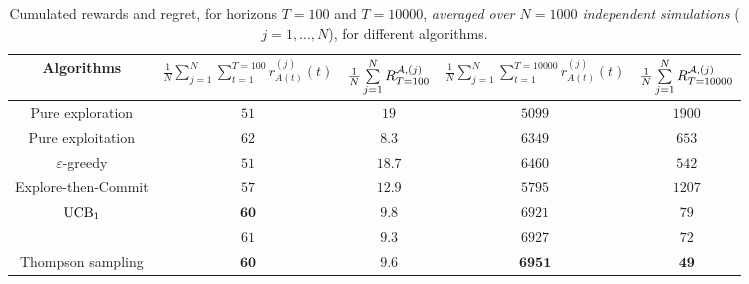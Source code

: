 \begin{table}[ht]
    \begin{small}  %
        \centering
        \begin{tabular}{c|cc|cc}
        \textbf{Algorithms} & $\frac{1}{N} \sum\limits_{j=1}^N \sum\limits_{t=1}^{T=100} r^{(j)}_{A(t)}(t)$ & $\frac{1}{N} \sum\limits_{j=1}^N R^{\mathcal{A},(j)}_{T=100}$ & $\frac{1}{N} \sum\limits_{j=1}^N \sum\limits_{t=1}^{T=10000} r^{(j)}_{A(t)}(t)$ & $\frac{1}{N} \sum\limits_{j=1}^N R^{\mathcal{A},(j)}_{T=10000}$ \\
            \hline
            Pure exploration
                & $51$ & $19$
                & $5099$ & $1900$ \\
            Pure exploitation
                & $62$ & $8.3$
                & $6349$ & $653$ \\
            \hline
            $\varepsilon$-greedy
                & $51$ & $18.7$
                & $6460$ & $542$ \\
            Explore-then-Commit
                & $57$ & $12.9$
                & $5795$ & $1207$ \\
            \hline
            $\mathrm{UCB}_1$
                & $\mathbf{60}$ & $\mathbf{9.8}$
                & $6921$ & $79$ \\
            \klUCB{}
                & $61$ & $9.3$
                & $6927$ & $72$ \\
            \hline
            Thompson sampling
                & $\mathbf{60}$ & $\mathbf{9.6}$
                & $\mathbf{6951}$ & $\mathbf{49}$ \\
            \hline
        \end{tabular}
        \caption{Cumulated rewards and regret, for horizons $T=100$ and $T=10000$, \emph{averaged over $N=1000$ independent simulations} ($j=1,\dots,N$), for different algorithms.}
        \label{table:2:meanResults}
    \end{small}  %
\end{table}


